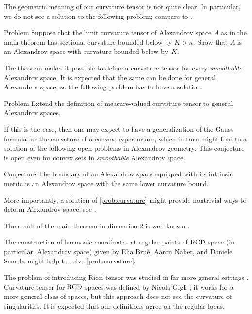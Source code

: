 The geometric meaning of our curvature tensor is not quite clear. 
In particular, we do not see a solution to the following problem;
compare to \cite[Conjecture~1.1]{G}.

\begin{thm}{Problem}
Suppose that the limit curvature tensor of Alexandrov space $A$ as in the main theorem has sectional curvature bounded below by $K>\kappa$.
Show that $A$ is an Alexandrov space with curvature bounded below by~$K$.
\end{thm}

The theorem makes it possible to define a curvature tensor for every \emph{smoothable} Alexandrov space.
It is expected that the same can be done for general Alexandrov space; so the following problem has to have a solution:

\begin{thm}{Problem}\label{prob:curvature}
Extend the definition of measure-valued curvature tensor to general Alexandrov spaces.
\end{thm}

If this is the case, then one may expect to have a generalization of the Gauss formula for the curvature of a convex hypersurface, which in turn might lead to a solution of the following open problems in Alexandrov geometry.
This conjecture is open even for convex sets in \emph{smoothable} Alexandrov space.

\begin{thm}{Conjecture}
The boundary of an Alexandrov space equipped with its intrinsic metric is an Alexandrov space with the same lower curvature bound.
\end{thm}

More importantly, a solution of \ref{prob:curvature} might provide nontrivial ways to deform Alexandrov space; see \cite[Section 9]{petrunin-conc}. 

The result of the main theorem in dimension 2 is well known \cite[VII \S13]{AZ}.

The construction of harmonic coordinates at regular points of $\operatorname{RCD}$ space (in particular, Alexandrov space) given by Elia Bruè, Aaron Naber, and Daniele Semola \cite{BNS} might help to solve \ref{prob:curvature}.

The problem of introducing Ricci tensor
was studied in far more general settings \cite{G1,St,H,L}.
Curvature tensor for $\operatorname{RCD}$ spaces was defined by Nicola Gigli \cite{G};
it works for a more general class of spaces, but this approach does not see the curvature of singularities.
It is expected that our definitions agree on the regular locus.

